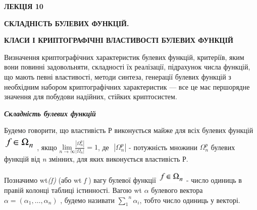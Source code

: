 \bigskip


\bigskip


\bigskip


\bigskip


\bigskip


\bigskip


\bigskip


\bigskip

{\bfseries
ЛЕКЦІЯ  10}


\bigskip

{\centering\bfseries
СКЛАДНІСТЬ БУЛЕВИХ ФУНКЦІЙ.
\par}

{\centering\bfseries
КЛАСИ  І  КРИПТОГРАФІЧНІ ВЛАСТИВОСТІ БУЛЕВИХ ФУНКЦІЙ
\par}


\bigskip


\bigskip

Визначення криптографічних характеристик булевих функцій, критеріїв, яким вони
повинні задовольняти, складності їх реалізації,  підрахунок  числа функцій, що
мають певні властивості, методи синтеза, генерації булевих функцій з необхідним
набором криптографічних характеристик --- все це має першорядне значення для
побудови надійних, стійких криптосистем.


\bigskip


\bigskip

{\centering\bfseries\itshape
Складність булевих функцій
\par}


\bigskip


\bigskip

Будемо говорити, що властивість Р виконується майже для всіх булевих функцій 
\includegraphics[width=0.6311in,height=0.2972in]{crypt-img/crypt-img169.png} ,
якщо  ${\underset{{n\rightarrow \infty }}{{\text{lim}}}\frac{|\Omega
_{{n}}^{{p}}|}{|\Omega _{{n}}|}=1}$, де  $ $ ${|\Omega _{{n}}^{{p}}|}$ -
потужність множини  ${\Omega _{{n}}^{{p}}}$ булевих функцій від \textit{n}
змінних, для яких виконується властивість Р.

Позначимо wt\textit{(}\textit{f}\textit{)} (або  wt \textit{f}\textit{ 
})\textit{  }вагу булевої  функції 
\includegraphics[width=0.528in,height=0.25in]{crypt-img/crypt-img170.png}  -
число одиниць в правій колонці таблиці істинності. Вагою wt ${\alpha }$
булевого вектора  ${\alpha =(\alpha _{{1}},\dots,\alpha
_{{n}})}$ , будемо називати  ${\overset{{n}}{\underset{{1}}{\sum }}{\alpha
_{{i}}}}$, тобто число одиниць у векторі.


